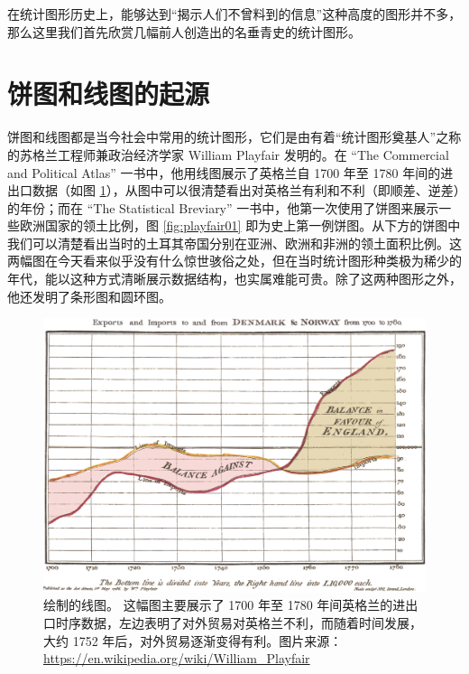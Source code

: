 \documentclass[
  b5paper,
  UTF8,twoside]{book}
\begin{document}
在统计图形历史上，能够达到``揭示人们不曾料到的信息''这种高度的图形并不多，那么这里我们首先欣赏几幅前人创造出的名垂青史的统计图形。

\section{饼图和线图的起源}\label{sec:pie-and-line-of-history}

饼图和线图都是当今社会中常用的统计图形，它们是由有着``统计图形奠基人''之称的苏格兰工程师兼政治经济学家 William Playfair 发明的。在 ``The Commercial and Political Atlas'' \citep{Playfair86} 一书中，他用线图展示了英格兰自 1700 年至 1780 年间的进出口数据（如图 \ref{fig:playfair86}），从图中可以很清楚看出对英格兰有利和不利（即顺差、逆差）的年份；而在 ``The Statistical Breviary'' \citep{Playfair01} 一书中，他第一次使用了饼图来展示一些欧洲国家的领土比例，图 \ref{fig:playfair01} 即为史上第一例饼图。从下方的饼图中我们可以清楚看出当时的土耳其帝国分别在亚洲、欧洲和非洲的领土面积比例。这两幅图在今天看来似乎没有什么惊世骇俗之处，但在当时统计图形种类极为稀少的年代，能以这种方式清晰展示数据结构，也实属难能可贵。除了这两种图形之外，他还发明了条形图和圆环图。

\begin{figure}

{\centering \includegraphics{images/Playfair-TimeSeries} 

}

\caption[William Playfair 的时序线图 ]{\citet{Playfair86} 绘制的线图。 这幅图主要展示了 1700 年至 1780 年间英格兰的进出口时序数据，左边表明了对外贸易对英格兰不利，而随着时间发展，大约 1752 年后，对外贸易逐渐变得有利。图片来源： \url{https://en.wikipedia.org/wiki/William_Playfair}}\label{fig:playfair86}
\end{figure}
\end{document}
